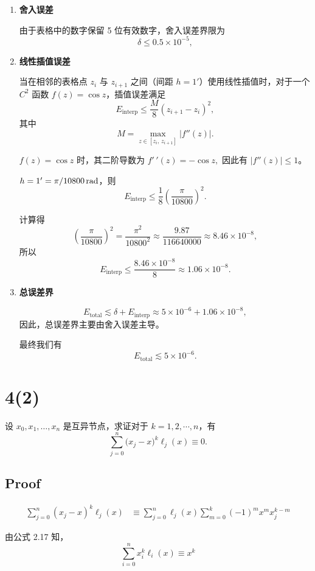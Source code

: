 \documentclass[11pt]{article}
\begin{document}
\begin{enumerate}
\def\labelenumi{\arabic{enumi}.}
\item
  \textbf{舍入误差}

  由于表格中的数字保留 5 位有效数字，舍入误差界限为 \[
  \delta \le 0.5 \times 10^{-5},
  \]
\item
  \textbf{线性插值误差}

  当在相邻的表格点 \(z_i\) 与 \(z_{i+1}\) 之间（间距
  \(h = 1'\)）使用线性插值时，对于一个 \(C^2\) 函数
  \(f(z)=\cos z\)，插值误差满足 \[
  E_{\text{interp}} \le \frac{M}{8}(z_{i+1}-z_i)^2,
  \] 其中 \[
  M = \max_{z\in[z_i,\,z_{i+1}]} |f''(z)|.
  \]

  \(f(z) = \cos z\) 时，其二阶导数为 \(f'\,'(z) = -\cos z,\) 因此有
  \(|f''(z)| \le 1\)。

  \(h = 1' = \pi/10800 \, \rm rad\)，则 \[
  E_{\text{interp}} \le \frac{1}{8}\left(\frac{\pi}{10800}\right)^2.
  \]

  计算得 \[
  \left(\frac{\pi}{10800}\right)^2 = \frac{\pi^2}{10800^2} \approx \frac{9.87}{116640000} \approx 8.46\times 10^{-8},
  \] 所以 \[
  E_{\text{interp}} \le \frac{8.46\times 10^{-8}}{8} \approx 1.06\times 10^{-8}.
  \]
\item
  \textbf{总误差界}

  \[
  E_{\text{total}} \lesssim \delta + E_{\text{interp}} \approx 5\times 10^{-6} + 1.06\times 10^{-8},
  \] 因此，总误差界主要由舍入误差主导。

  最终我们有 \[
  \boxed{E_{\text{total}} \lesssim 5\times 10^{-6}.}
  \]
\end{enumerate}

    \section{4(2)}\label{section}

设 \(x_0,x_1,\dots,x_n\) 是互异节点，求证对于
\(k = 1, 2, \cdots, n\)，有 \[
\sum_{j=0}^{n}\bigl(x_j-x\bigr)^k\ell_j(x) \equiv 0.
\]

\subsection{Proof}\label{proof}

\[
\begin{aligned}
\sum_{j = 0}^n(x_j - x)^k\ell_j(x)&\equiv
\sum_{j = 0}^n\ell_j(x)\sum_{m = 0}^k(-1)^mx^mx_j^{k - m}
\end{aligned}
\]

由公式 2.17 知， \[
\sum_{i = 0}^nx_i^k\ell_i(x)\equiv x^k
\]
\end{document}
